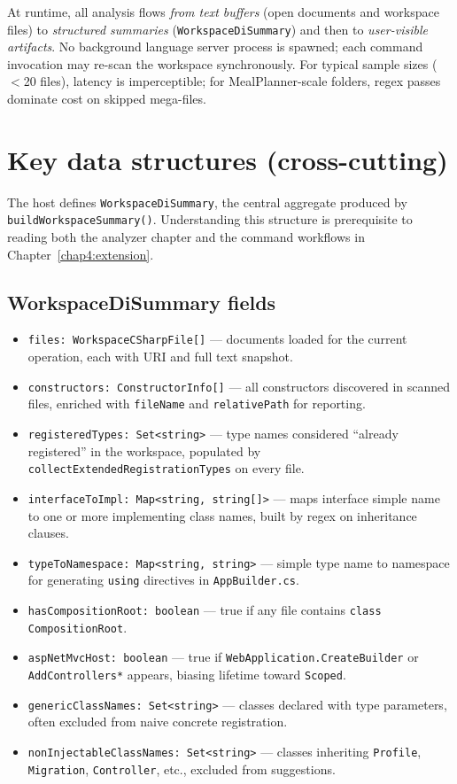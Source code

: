 At runtime, all analysis flows \emph{from text buffers} (open documents and workspace files) to \emph{structured summaries} (\texttt{WorkspaceDiSummary}) and then to \emph{user-visible artifacts}. No background language server process is spawned; each command invocation may re-scan the workspace synchronously. For typical sample sizes ($<$20 files), latency is imperceptible; for MealPlanner-scale folders, regex passes dominate cost on skipped mega-files.

\section{Key data structures (cross-cutting)}
\label{chap2:data-structures}

The host defines \texttt{WorkspaceDiSummary}, the central aggregate produced by \texttt{buildWorkspaceSummary()}. Understanding this structure is prerequisite to reading both the analyzer chapter and the command workflows in Chapter~\ref{chap4:extension}.

\subsection{WorkspaceDiSummary fields}

\begin{itemize}
	\item \texttt{files: WorkspaceCSharpFile[]} --- documents loaded for the current operation, each with URI and full text snapshot.
	\item \texttt{constructors: ConstructorInfo[]} --- all constructors discovered in scanned files, enriched with \texttt{fileName} and \texttt{relativePath} for reporting.
	\item \texttt{registeredTypes: Set<string>} --- type names considered ``already registered'' in the workspace, populated by \texttt{collectExtendedRegistrationTypes} on every file.
	\item \texttt{interfaceToImpl: Map<string, string[]>} --- maps interface simple name to one or more implementing class names, built by regex on inheritance clauses.
	\item \texttt{typeToNamespace: Map<string, string>} --- simple type name to namespace for generating \texttt{using} directives in \texttt{AppBuilder.cs}.
	\item \texttt{hasCompositionRoot: boolean} --- true if any file contains \texttt{class CompositionRoot}.
	\item \texttt{aspNetMvcHost: boolean} --- true if \texttt{WebApplication.CreateBuilder} or \texttt{AddControllers*} appears, biasing lifetime toward \texttt{Scoped}.
	\item \texttt{genericClassNames: Set<string>} --- classes declared with type parameters, often excluded from naive concrete registration.
	\item \texttt{nonInjectableClassNames: Set<string>} --- classes inheriting \texttt{Profile}, \texttt{Migration}, \texttt{Controller}, etc., excluded from suggestions.
\end{itemize}

